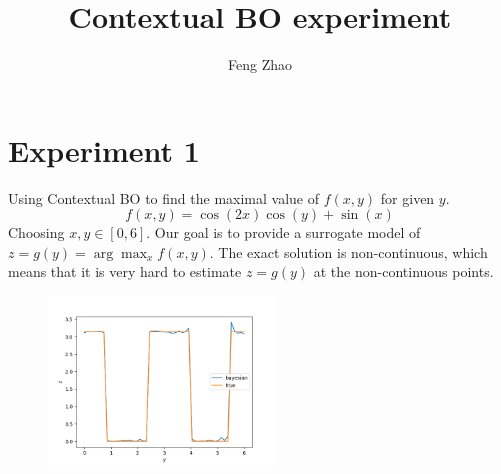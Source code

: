 \documentclass{article}
\title{Contextual BO experiment}
\author{Feng Zhao}
\begin{document}
\maketitle
\section{Experiment 1}
Using Contextual BO to find the maximal value of $f(x,y)$ for given $y$.
\begin{equation}
    f(x,y) = \cos(2 x) \cos(y) + \sin(x)
\end{equation}
Choosing $x,y \in [0,6]$. Our goal is to provide a surrogate model of $z=g(y)=\arg\max_{x} f(x,y)$.
The exact solution is non-continuous, which means that it is very hard to estimate $z=g(y)$ at the
non-continuous points.
\begin{figure}[!ht]
    \centering
    \includegraphics[width=6cm]{cbo_1.png}
\end{figure}
\end{document}
